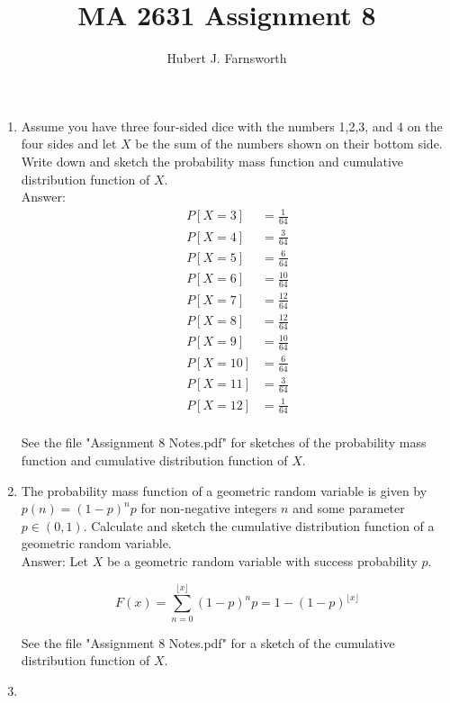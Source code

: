 \documentclass{article}
\title{MA 2631 Assignment 8}
\author{Hubert J. Farnsworth}
\begin{document}
\maketitle

\begin{enumerate}

\item

Assume you have three four-sided dice with the numbers 1,2,3, and 4 on the four sides and let $X$ be the sum of the numbers shown on their bottom side. Write down and sketch the probability mass function and cumulative distribution function of $X$. \\

Answer: 
\begin{align*}
P[X = 3] &= \frac{1}{64} \\
P[X =  4] &= \frac{3}{64} \\
P[X =  5] &= \frac{6}{64}  \\
P[X =  6] &= \frac{10}{64}  \\
P[X =  7] &= \frac{12}{64}  \\
P[X =  8] &= \frac{12}{64}  \\
P[X =  9] &= \frac{10}{64}  \\
P[X =  10] &= \frac{6}{64}  \\
P[X =  11] &= \frac{3}{64}  \\
P[X =  12] &= \frac{1}{64}  \\
\end{align*}

See the file "Assignment 8 Notes.pdf" for sketches of the probability mass function and cumulative distribution function of $X$. 


\item

The probability mass function of a geometric random variable is given by $p(n) = (1-p)^np$ for non-negative integers $n$ and some parameter $p \in (0,1)$. Calculate and sketch the cumulative distribution function of a geometric random variable. \\

Answer: Let $X$ be a geometric random variable with success probability $p$. 

$$
F(x) = \sum_{n=0}^{\lfloor x \rfloor} (1-p)^np = 1- (1-p)^{\lfloor x \rfloor}
$$

See the file "Assignment 8 Notes.pdf" for a sketch of the cumulative distribution function of $X$. 

\newpage
\item


\end{enumerate}
\end{document}
